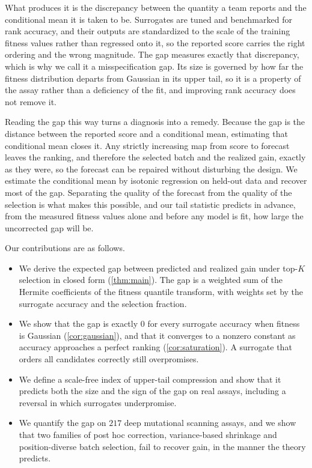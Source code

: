 \documentclass{article}
\theoremstyle{plain}
\theoremstyle{definition}
\begin{document}
What produces it is the discrepancy between the quantity a team reports and the
conditional mean it is taken to be. Surrogates are tuned and benchmarked for rank
accuracy, and their outputs are standardized to the scale of the training fitness
values rather than regressed onto it, so the reported score carries the right ordering
and the wrong magnitude. The gap measures exactly that discrepancy, which is why we
call it a misspecification gap. Its size is governed by how far the fitness
distribution departs from Gaussian in its upper tail, so it is a property of the assay
rather than a deficiency of the fit, and improving rank accuracy does not remove it.

Reading the gap this way turns a diagnosis into a remedy. Because the gap is the
distance between the reported score and a conditional mean, estimating that conditional
mean closes it. Any strictly increasing map from score to forecast leaves the ranking,
and therefore the selected batch and the realized gain, exactly as they were, so the
forecast can be repaired without disturbing the design. We estimate the conditional
mean by isotonic regression on held-out data and recover most of the gap. Separating
the quality of the forecast from the quality of the selection is what makes this
possible, and our tail statistic predicts in advance, from the measured fitness values
alone and before any model is fit, how large the uncorrected gap will be.

Our contributions are as follows.

\begin{itemize}
\item We derive the expected gap between predicted and realized gain under top-$K$
selection in closed form (\cref{thm:main}). The gap is a weighted sum of the Hermite
coefficients of the fitness quantile transform, with weights set by the surrogate
accuracy and the selection fraction.
\item We show that the gap is exactly $0$ for every surrogate accuracy when fitness is
Gaussian (\cref{cor:gaussian}), and that it converges to a nonzero constant as accuracy
approaches a perfect ranking (\cref{cor:saturation}). A surrogate that orders all
candidates correctly still overpromises.
\item We define a scale-free index of upper-tail compression and show that it predicts
both the size and the sign of the gap on real assays, including a reversal in which
surrogates underpromise.
\item We quantify the gap on $217$ deep mutational scanning assays, and we show that
two families of post hoc correction, variance-based shrinkage and position-diverse
batch selection, fail to recover gain, in the manner the theory predicts.
\end{itemize}
\end{document}
